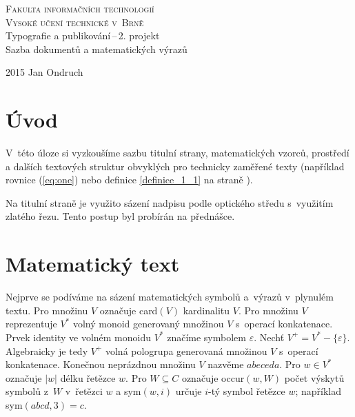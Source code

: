 \documentclass[11pt,a4paper,twocolumn,oneside]{article}
\theoremstyle{definition}
\theoremstyle{plain}
\theoremstyle{plain}
\begin{document}
\addtolength{}
\addtolength{}

\begin{titlepage}
\begin{center}

{\Huge\textsc{Fakulta informačních technologií}}\\ \smallskip
{\Huge\textsc{Vysoké učení technické v~Brně}}\\
{\LARGE{Typografie a publikování\,--\,2. projekt}}\\
{\LARGE{Sazba dokumentů a matematických výrazů}}
\end{center}		
\Large{2015 \hfill Jan Ondruch}
\end{titlepage}

	
	\section*{Úvod}
	
V~této úloze si vyzkoušíme sazbu titulní strany, matematických vzorců, prostředí a dalších textových struktur obvyklých pro technicky zaměřené texty (například rovnice (\ref{eq:one}) nebo definice \ref{definice_1_1} na straně \pageref{definice_1_1}).

Na titulní straně je využito sázení nadpisu podle optického středu s~využitím zlatého řezu. Tento postup byl probírán na přednášce.

	\section{Matematický text}
	
Nejprve se podíváme na sázení matematických symbolů a~výrazů v~plynulém textu. Pro množinu $V$ označuje card$(V)$ kardinalitu $V$.
Pro množinu $V$ reprezentuje $V^*$ volný monoid generovaný množinou $V$ s~operací konkatenace.
Prvek identity ve volném monoidu $V^*$ značíme symbolem $\varepsilon$.
Nechť $V^+=V^*-\{\varepsilon\}$. Algebraicky je tedy $V^+$ volná pologrupa generovaná množinou $V$ s~operací konkatenace.
Konečnou neprázdnou množinu $V$ nazvěme $abeceda$.
Pro $w \in V^*$ označuje $|w|$ délku řetězce $w$. Pro $W \subseteq C$ označuje occur$(w,W)$ počet výskytů symbolů z~$W$ v~řetězci $w$ a sym$(w, i)$ určuje $i$-tý symbol řetězce $w$; například sym$(abcd,3)=c$.
\end{document}
